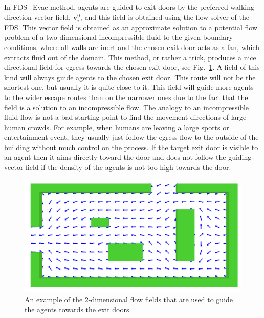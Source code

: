 \documentclass[12pt,a4paper,final,twoside]{stylevk}
\begin{document}
In FDS+Evac method, agents are guided to exit doors by the preferred
walking direction vector field, $ \mathbf{v}_i^0$, and this field is
obtained using the flow solver of the FDS.  This vector field is
obtained as an approximate solution to a potential flow problem of a
two-dimensional incompressible fluid to the given boundary conditions,
where all walls are inert and the chosen exit door acts as a fan,
which extracts fluid out of the domain.  This method, or rather a
trick, produces a nice directional field for egress towards the chosen
exit door, see Fig.~\ref{Fig_EvacFlowField}.  A field of this kind
will always guide agents to the chosen exit door.  This route will not
be the shortest one, but usually it is quite close to it.  This field
will guide more agents to the wider escape routes than on the narrower
ones due to the fact that the field is a solution to an incompressible
flow.  The analogy to an incompressible fluid flow is not a bad
starting point to find the movement directions of large human crowds.
For example, when humans are leaving a large sports or entertainment
event, they usually just follow the egress flow to the outside of the
building without much control on the process.  If the target exit door
is visible to an agent then it aims directly toward the door and does
not follow the guiding vector field if the density of the agents is
not too high towards the door.

%
\begin{figure}[!tb]
  \centerline{\includegraphics[clip=true,width=120mm]{FIGURES/evac_ffield}}
  \caption{An example of the 2-dimensional flow fields that are used
    to guide the agents towards the exit doors.}\label{Fig_EvacFlowField}
\end{figure}
%
\end{document}

